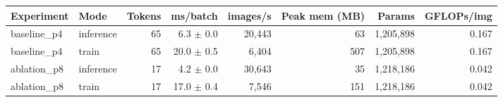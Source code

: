 \begin{tabular}{llrrrrrr}
\toprule
Experiment & Mode & Tokens & ms/batch & images/s & Peak mem (MB) & Params & GFLOPs/img \\
\midrule
baseline\_p4 & inference & 65 & 6.3 $\pm$ 0.0 & 20,443 & 63 & 1,205,898 & 0.167 \\
baseline\_p4 & train & 65 & 20.0 $\pm$ 0.5 & 6,404 & 507 & 1,205,898 & 0.167 \\
ablation\_p8 & inference & 17 & 4.2 $\pm$ 0.0 & 30,643 & 35 & 1,218,186 & 0.042 \\
ablation\_p8 & train & 17 & 17.0 $\pm$ 0.4 & 7,546 & 151 & 1,218,186 & 0.042 \\
\bottomrule
\end{tabular}
